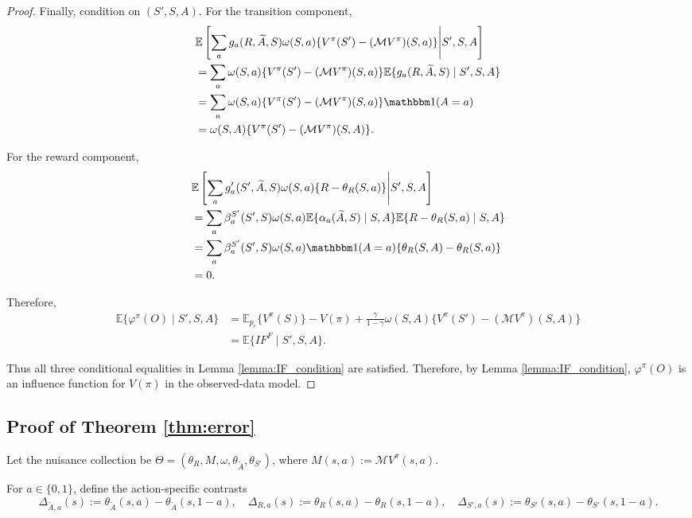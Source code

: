 \documentclass[12pt]{article}
\newcommand{\0}{\boldsymbol{0}}
\begin{document}
\begin{proof}
Finally, condition on $(S',S,A)$. For the transition component,
\[
\begin{aligned}
&\mathbb E\left[\sum_ag_a(R,\widetilde A,S)\omega(S,a)\{V^\pi(S')-(\mathcal M V^\pi)(S,a)\}\middle| S',S,A\right] \\
&=\sum_a\omega(S,a)\{V^\pi(S')-(\mathcal M V^\pi)(S,a)\}\mathbb E\{g_a(R,\widetilde A,S)\mid S',S,A\} \\
&=\sum_a\omega(S,a)\{V^\pi(S')-(\mathcal M V^\pi)(S,a)\}\mathbbm 1(A=a) \\
&=\omega(S,A)\{V^\pi(S')-(\mathcal M V^\pi)(S,A)\}.
\end{aligned}
\]

For the reward component,
\[
\begin{aligned}
&\mathbb E\left[
\sum_ag_a'(S',\widetilde A,S)\omega(S,a)\{R-\theta_R(S,a)\}
\middle| S',S,A\right] \\
&=\sum_a\beta_a^{S'}(S',S)\omega(S,a)\mathbb E\{\alpha_a(\widetilde A,S)\mid S,A\} 
\mathbb E\{R-\theta_R(S,a)\mid S,A\} \\
&=\sum_a\beta_a^{S'}(S',S)\omega(S,a)\mathbbm 1(A=a)\{\theta_R(S,A)-\theta_R(S,a)\} \\
&=0.
\end{aligned}
\]

Therefore,
\[
\begin{aligned}
\mathbb E\{\varphi^\pi(O)\mid S',S,A\}
&=\mathbb E_{p_e}\{V^\pi(S)\}-V(\pi)  +\frac{\gamma}{1-\gamma}\omega(S,A)\{V^\pi(S')-(\mathcal M V^\pi)(S,A)\} \\
&=\mathbb E\{IF^F\mid S',S,A\}.
\end{aligned}
\]


Thus all three conditional equalities in Lemma \ref{lemma:IF_condition} are satisfied. Therefore, by Lemma \ref{lemma:IF_condition}, \(\varphi^\pi(O)\) is an influence function for \(V(\pi)\) in the observed-data model.
\end{proof}

\subsection{Proof of Theorem \ref{thm:error}}
Let the nuisance collection be \(\Theta=(\theta_R, M,\omega,\theta_{\widetilde A},\theta_{S'})\), where $M(s,a) := \mathcal{M}V^\pi(s,a).$

For $a\in\{0,1\}$, define the action-specific contrasts
\[
\Delta_{\tilde A,a}(s):=\theta_{\tilde A}(s,a)-\theta_{\tilde A}(s,1-a),
\quad
\Delta_{R,a}(s):=\theta_R(s,a)-\theta_R(s,1-a),
\quad
\Delta_{S',a}(s):=\theta_{S'}(s,a)-\theta_{S'}(s,1-a).
\]
\end{document}
